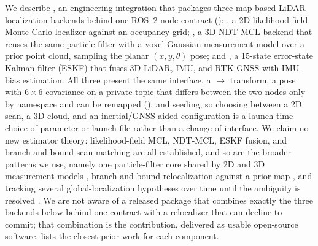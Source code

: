 We describe \emph{\sname}, an engineering integration that packages three map-based LiDAR localization backends behind one ROS~2 node contract (): , a 2D likelihood-field Monte Carlo localizer against an occupancy grid; , a 3D NDT-MCL backend \citep{saarinen2013ndtmcl} that reuses the same particle filter with a voxel-Gaussian measurement model over a prior point cloud, sampling the planar $(x,y,\theta)$ pose; and , a 15-state error-state Kalman filter (ESKF) that fuses 3D LiDAR, IMU, and RTK-GNSS with IMU-bias estimation. All three present the same interface, a $\to$ transform, a pose with $6\times6$ covariance on a private  topic that differs between the two nodes only by namespace and can be remapped (), and  seeding, so choosing between a 2D scan, a 3D cloud, and an inertial/GNSS-aided configuration is a launch-time choice of parameter or launch file rather than a change of interface. We claim no new estimator theory: likelihood-field MCL, NDT-MCL, ESKF fusion, and branch-and-bound scan matching are all established, and so are the broader patterns we use, namely one particle-filter core shared by 2D and 3D measurement models \citep{puga2024beluga,ekumen2022belugarepo}, branch-and-bound relocalization against a prior map \citep{hess2016realtime,koide2021hdlgl}, and tracking several global-localization hypotheses over time until the ambiguity is resolved \citep{gao2019global,garcia2023mhamcl}. We are not aware of a released package that combines exactly the three backends below behind one contract with a relocalizer that can decline to commit; that combination is the contribution, delivered as usable open-source software.  lists the closest prior work for each component.
